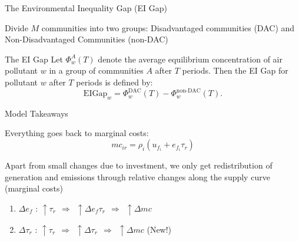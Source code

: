 \documentclass[11pt, aspectratio = 169]{beamer}
\newcommand{\1}{\mathds{1}}
\begin{document}
\begin{frame}{The Environmental Inequality Gap (EI Gap)}
    
Divide $M$ communities into two groups: Disadvantaged communities (DAC) and Non-Disadvantaged Communities (non-DAC)

\vfill
\begin{block}{The EI Gap}
    Let $\Phi_w^A(T)$ denote the average equilibrium concentration of air pollutant $w$ in a group of communities $A$ after $T$ periods. Then the EI Gap for pollutant $w$ after $T$ periods is defined by:
    \begin{equation}
        \text{EIGap}_w = \Phi_w^\text{DAC}(T) - \Phi_w^\text{non-DAC}(T).
    \end{equation}
\end{block}

\end{frame}


\begin{frame}{Model Takeaways}

Everything goes back to marginal costs:
\begin{equation*}
    mc_{ir} = \rho_i(u_{f_i} + e_{f_i} \tau_r)
\end{equation*}

\vfill
Apart from small changes due to investment, we only get redistribution of generation and emissions through relative changes along the supply curve (marginal costs)

\vfill
\begin{enumerate}
    \item $\Delta e_f$  :  $\uparrow \tau_r ~~\Rightarrow ~~ \uparrow \Delta e_f \tau_r ~~\Rightarrow ~~ \uparrow \Delta mc$
    \item $\Delta \tau_r$  :  $\uparrow \tau_r ~~\Rightarrow ~~ \uparrow \Delta \tau_r ~~\Rightarrow ~~ \uparrow \Delta mc$ \hfill (New!)
\end{enumerate}

\end{frame}



\end{document}
